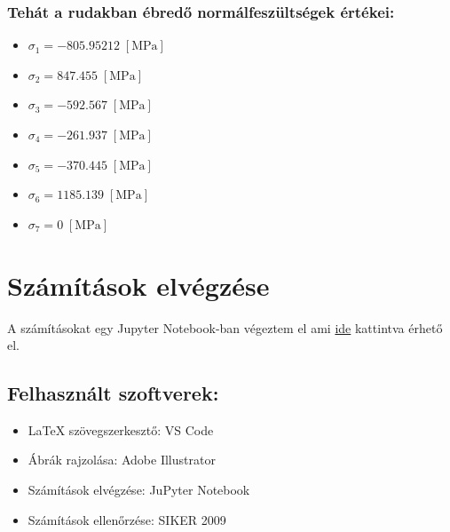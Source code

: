 \documentclass[12pt,a4paper]{article}
\def\Mpa{\; \left[\mathrm{MPa}\right]}
\begin{document}
\subsubsection*{Tehát a rudakban ébredő normálfeszültségek értékei:}
\begin{multicols}{2}
    \begin{itemize}
        \item $\sigma_1= -805.95212 \Mpa$
        \item $\sigma_2=  847.455 \Mpa$
        \item $\sigma_3=  -592.567 \Mpa$
        \item $\sigma_4=  -261.937 \Mpa$
    \end{itemize}
    \columnbreak
    \begin{itemize}
        \item $\sigma_5= -370.445 \Mpa$
        \item $\sigma_6=  1185.139 \Mpa$
        \item $\sigma_7=  0 \Mpa$
    \end{itemize}
\end{multicols}

\section*{Számítások elvégzése}
A számításokat egy Jupyter Notebook-ban végeztem el ami 
\href{https://github.com/near731/VEM_SZHF1_Python/blob/master/vem_szhf1.ipynb}{ide} kattintva érhető el.

\newpage
\tableofcontents

\subsection*{Felhasznált szoftverek:}
\begin{itemize}
    \item \LaTeX \hspace{0.4mm} szövegszerkesztő: VS Code
    \item Ábrák rajzolása: Adobe Illustrator
    \item Számítások elvégzése: JuPyter Notebook
    \item Számítások ellenőrzése: SIKER 2009
\end{itemize}
\end{document}
